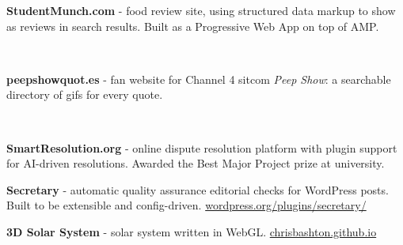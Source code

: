 \documentclass[10pt,a4paper,ragged2e,withhyper]{altacv}
\begin{document}
\begin{paracol}{2}
\divider


\divider


\newpage


\def\spacer{0.7cm}

\textbf{StudentMunch.com} - food review site, using structured data markup to show as reviews in search results. Built as a Progressive Web App on top of AMP.

\medskip

  \\

\vspace{\spacer}

\textbf{peepshowquot.es} - fan website for Channel 4 sitcom \emph{Peep Show}: a searchable directory of gifs for every quote.

\medskip

  \\

\vspace{\spacer}

\textbf{SmartResolution.org} - online dispute resolution platform with plugin support for AI-driven resolutions. Awarded the Best Major Project prize at university.

\medskip


\vspace{\spacer}

\textbf{Secretary} - automatic quality assurance editorial checks for WordPress posts. Built to be extensible and config-driven.
\newline
\href{https://wordpress.org/plugins/secretary/}{\url{wordpress.org/plugins/secretary/}}

\medskip


\medskip

\textbf{3D Solar System} - solar system written in WebGL.
\newline
\href{https://chrisbashton.github.io}{\url{chrisbashton.github.io}}

\medskip


\medskip



\customreferences

\end{paracol}
\end{document}

